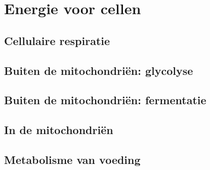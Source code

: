 \documentclass[a4paper,kul]{kulakarticle} %
\begin{document}
\section{Energie voor cellen}
\subsection{Cellulaire respiratie}
\subsection{Buiten de mitochondriën: glycolyse}
\subsection{Buiten de mitochondriën: fermentatie}
\subsection{In de mitochondriën}
\subsection{Metabolisme van voeding}
\end{document}
